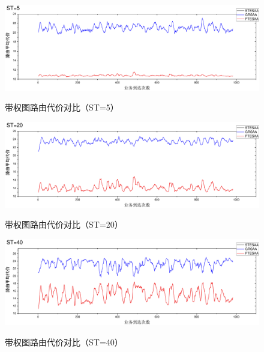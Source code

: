 \begin{figure}
\vspace{-0.5cm}
\setlength{\abovecaptionskip}{-0.5cm}
\begin{center}
{\includegraphics[width=1 \textwidth]{figures/H5C.pdf}}
\end{center}
\caption{{\footnotesize{带权图路由代价对比（ST=5）}}}
\label{H5C}
\end{figure}
\begin{figure}
\vspace{-0.5cm}
\setlength{\abovecaptionskip}{-0.5cm}
\begin{center}
{\includegraphics[width=1 \textwidth]{figures/H20C.pdf}}
\end{center}
\caption{{\footnotesize{带权图路由代价对比（ST=20）}}}
\label{H20C}
\end{figure}
\begin{figure}
\vspace{-0.5cm}
\setlength{\abovecaptionskip}{-0.5cm}
\begin{center}
{\includegraphics[width=1 \textwidth]{figures/H40C.pdf}}
\end{center}
\caption{{\footnotesize{带权图路由代价对比（ST=40）}}}
\label{H40C}
\end{figure}

